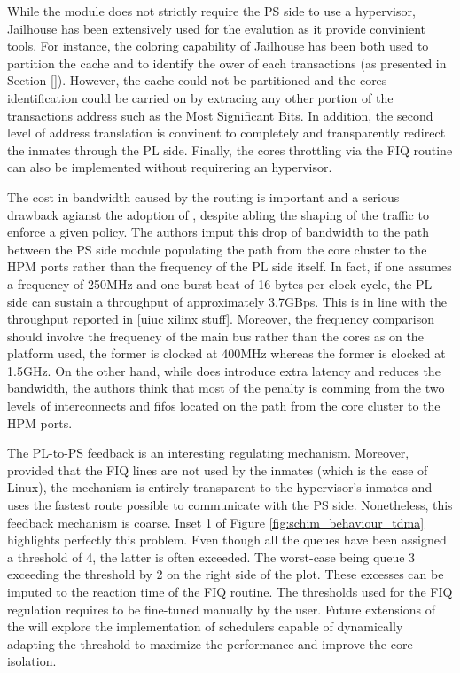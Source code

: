 While the \schim module does not strictly require the PS side to use a hypervisor,
Jailhouse has been extensively used for the evalution as it provide convinient tools.
For instance, the coloring capability of Jailhouse has been both used to partition
the cache and to identify the ower of each transactions (as presented in Section \ref{}).
However, the cache could not be partitioned and the cores identification could be
carried on by extracing any other portion of the transactions address such as the
Most Significant Bits. In addition, the second level of address translation is
convinent to completely and transparently redirect the inmates through the PL side.
Finally, the cores throttling via the FIQ routine can also be implemented without
requirering an hypervisor.

The cost in bandwidth caused by the routing is important and a serious drawback
agianst the adoption of \schim, despite abling the shaping of the traffic to
enforce a given policy.
The authors imput this drop of bandwidth to the path between the PS side module
populating the path from the core cluster to the HPM ports rather than the
frequency of the PL side itself. In fact, if one assumes a frequency of 250MHz
and one burst beat of 16 bytes per clock cycle, the PL side can sustain a
throughput of approximately 3.7GBps. This is in line with the throughput reported
in [uiuc xilinx stuff]. Moreover, the frequency comparison should involve the
frequency of the main bus rather than the cores as on the platform used, the former
is clocked at 400MHz whereas the former is clocked at 1.5GHz. On the other hand,
while \schim does introduce extra latency and reduces the bandwidth, the authors
think that most of the penalty is comming from the two levels of interconnects
and fifos located on the path from the core cluster to the HPM ports.

The PL-to-PS feedback is an interesting regulating mechanism. Moreover, provided
that the FIQ lines are not used by the inmates (which is the case of Linux), the
mechanism is entirely transparent to the hypervisor's inmates and uses the fastest
route possible to communicate with the PS side. Nonetheless, this feedback mechanism
is coarse. Inset 1 of Figure \ref{fig:schim_behaviour_tdma} highlights perfectly
this problem. Even though all the queues have been assigned a threshold of 4, the
latter is often exceeded. The worst-case being queue 3 exceeding the threshold by
2 on the right side of the plot. These excesses can be imputed to the reaction time
of the FIQ routine. The thresholds used for the FIQ regulation requires to be
fine-tuned manually by the user. Future extensions of the \schim will explore the
implementation of schedulers capable of dynamically adapting the threshold to
maximize the performance and improve the core isolation.
\color{black}
